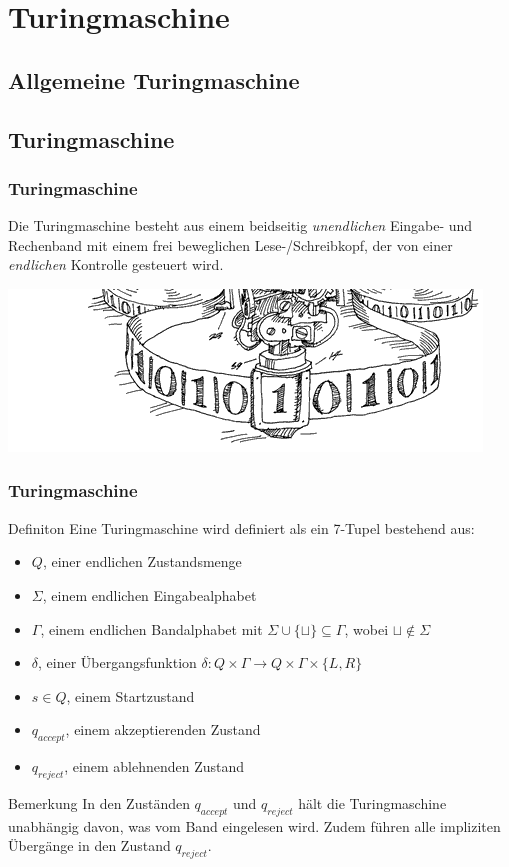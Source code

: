 


\section{Turingmaschine}
\subsection{Allgemeine Turingmaschine}
\subsection{Turingmaschine}
\begin{frame}
	\frametitle{Turingmaschine}
	Die Turingmaschine besteht aus einem beidseitig \emph{unendlichen} Eingabe- und Rechenband
	mit einem frei beweglichen Lese-/Schreibkopf, der von einer \emph{endlichen} Kontrolle gesteuert wird. 
	\begin{center}
		\vspace{1cm}
		\hspace{-12mm}
		\includegraphics[scale=0.5]{images/tmaschine.png}
	\end{center}
\end{frame}
\begin{frame}
\frametitle{Turingmaschine}
\begin{block}{Definiton}
Eine Turingmaschine wird definiert als ein 7-Tupel bestehend aus:
 \begin{itemize}
 \item $Q$, einer endlichen Zustandsmenge
 \item $\Sigma$, einem endlichen Eingabealphabet
 \item $\Gamma$, einem endlichen Bandalphabet mit $\Sigma \cup\{\sqcup\} \subseteq \Gamma$, wobei $\sqcup \notin \Sigma$
 \item $\delta$, einer Übergangsfunktion $\delta: Q\times\Gamma \rightarrow Q\times\Gamma\times\{L, R\}$
 \item $s \in Q$, einem Startzustand
 \item $q_{accept}$, einem akzeptierenden Zustand
 \item $q_{reject}$, einem ablehnenden Zustand
 \end{itemize}
\end{block}
\begin{block}{Bemerkung}
 In den Zuständen $q_{accept}$ und $q_{reject}$ hält die Turingmaschine unabhängig davon, was vom Band eingelesen wird. Zudem führen alle impliziten Übergänge in den Zustand $q_{reject}$.
\end{block}
\end{frame}

